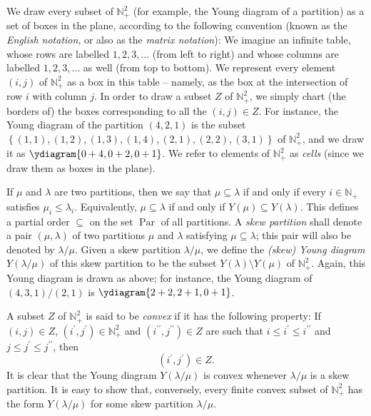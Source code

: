 \documentclass[numbers=enddot,12pt,final,onecolumn,notitlepage]{scrartcl}%
\theoremstyle{definition}
\begin{document}
We draw every subset of $\mathbb{N}_{+}^{2}$ (for example, the Young diagram
of a partition) as a set of boxes in the plane, according to the following
convention (known as the \textit{English notation}, or also as the
\textit{matrix notation}): We imagine an infinite table, whose rows are
labelled $1,2,3,\ldots$ (from left to right) and whose columns are labelled
$1,2,3,\ldots$ as well (from top to bottom). We represent every element
$\left(  i,j\right)  $ of $\mathbb{N}_{+}^{2}$ as a box in this table --
namely, as the box at the intersection of row $i$ with column $j$. In order to
draw a subset $Z$ of $\mathbb{N}_{+}^{2}$, we simply chart (the borders of)
the boxes corresponding to all the $\left(  i,j\right)  \in Z$. For instance,
the Young diagram of the partition $\left(  4,2,1\right)  $ is the subset
$\left\{  \left(  1,1\right)  ,\left(  1,2\right)  ,\left(  1,3\right)
,\left(  1,4\right)  ,\left(  2,1\right)  ,\left(  2,2\right)  ,\left(
3,1\right)  \right\}  $ of $\mathbb{N}_{+}^{2}$, and we draw it as $%
\ydiagram{0+4,0+2,0+1}%
$. We refer to elements of $\mathbb{N}_{+}^{2}$ as \textit{cells} (since we
draw them as boxes in the plane).

If $\mu$ and $\lambda$ are two partitions, then we say that $\mu
\subseteq\lambda$ if and only if every $i\in\mathbb{N}_{+}$ satisfies $\mu
_{i}\leq\lambda_{i}$. Equivalently, $\mu\subseteq\lambda$ if and only if
$Y\left(  \mu\right)  \subseteq Y\left(  \lambda\right)  $. This defines a
partial order $\subseteq$ on the set $\operatorname*{Par}$ of all partitions.
A \textit{skew partition} shall denote a pair $\left(  \mu,\lambda\right)  $
of two partitions $\mu$ and $\lambda$ satisfying $\mu\subseteq\lambda$; this
pair will also be denoted by $\lambda/\mu$. Given a skew partition
$\lambda/\mu$, we define the \textit{(skew) Young diagram} $Y\left(
\lambda/\mu\right)  $ of this skew partition to be the subset $Y\left(
\lambda\right)  \setminus Y\left(  \mu\right)  $ of $\mathbb{N}_{+}^{2}$.
Again, this Young diagram is drawn as above; for instance, the Young diagram
of $\left(  4,3,1\right)  /\left(  2,1\right)  $ is $%
\ydiagram{2+2,2+1,0+1}%
$.

A subset $Z$ of $\mathbb{N}_{+}^{2}$ is said to be \textit{convex} if it has
the following property: If $\left(  i,j\right)  \in Z$, $\left(  i^{\prime
},j^{\prime}\right)  \in\mathbb{N}_{+}^{2}$ and $\left(  i^{\prime\prime
},j^{\prime\prime}\right)  \in Z$ are such that $i\leq i^{\prime}\leq
i^{\prime\prime}$ and $j\leq j^{\prime}\leq j^{\prime\prime}$, then
\begin{equation}
\left(  i^{\prime},j^{\prime}\right)  \in Z. \label{eq.convex}%
\end{equation}
It is clear that the Young diagram $Y\left(  \lambda/\mu\right)  $ is convex
whenever $\lambda/\mu$ is a skew partition. It is easy to show that,
conversely, every finite convex subset of $\mathbb{N}_{+}^{2}$ has the form
$Y\left(  \lambda/\mu\right)  $ for some skew partition $\lambda/\mu$.
\end{document}

